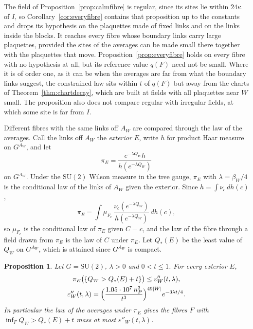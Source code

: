 \documentclass[11pt]{amsart}
\newtheorem{proposition}[theorem]{Proposition}
\theoremstyle{definition}
\theoremstyle{remark}
\numberwithin{equation}{section}
\newcommand{\SU}{\mathrm{SU}}
\begin{document}
The field of Proposition~\ref{prop:calmfibre} is regular, since its sites lie
within $24\kappa$ of $I$, so Corollary~\ref{cor:everyfibre} contains that
proposition up to the constants and drops its hypothesis on the plaquettes
made of fixed links and on the links inside the blocks. It reaches every
fibre whose boundary links carry large plaquettes, provided the sites of the
averages can be made small there together with the plaquettes that move.
Proposition~\ref{prop:everyfibre} holds on every fibre with no hypothesis at
all, but its reference value $q(F)$ need not be small. Where it is of order
one, as it can be when the averages are far from what the boundary links
suggest, the constrained law sits within $t$ of $q(F)$ but away from the
charts of Theorem~\ref{thm:chartdecay}, which are built at fields
with all plaquettes near $W$ small. The proposition also does not compare
regular with irregular fields, at which some site is far from $I$.

Different fibres with the same links off $A_W$ are compared through the
law of the averages. Call the links off $A_W$ the \emph{exterior} $E$, write
$h$ for product Haar measure on $G^{A_W}$, and let
\[
\pi_E=\frac{e^{-\lambda Q_W}h}{h(e^{-\lambda Q_W})}
\]
on $G^{A_W}$. Under the $\SU(2)$ Wilson measure in the tree gauge, $\pi_E$
with $\lambda=\beta_W/4$ is the conditional law of the links of $A_W$ given
the exterior. Since $h=\int\nu_c\,dh(c)$,
\[
\pi_E=\int\mu_{F_c}\,\frac{\nu_c(e^{-\lambda Q_W})}{h(e^{-\lambda Q_W})}
\,dh(c),
\]
so $\mu_{F_c}$ is the conditional law of $\pi_E$ given $C=c$, and the law
of the fibre through a field drawn from $\pi_E$ is the law of $C$ under
$\pi_E$. Let $Q_*(E)$ be the least value of $Q_W$ on $G^{A_W}$, which is
attained since $G^{A_W}$ is compact.

\begin{proposition}\label{prop:fibrecompare}
Let $G=\SU(2)$, $\lambda>0$ and $0<t\le1$. For every exterior $E$,
\begin{gather*}
\pi_E\bigl(\{Q_W>Q_*(E)+t\}\bigr)\le\varepsilon''_W(t,\lambda),\\
\varepsilon''_W(t,\lambda)=\Bigl(\frac{1.05\cdot10^7\,n_P^3}{t^3}\Bigr)
^{49|W|}e^{-3\lambda t/4}.
\end{gather*}
In particular the law of the averages under $\pi_E$ gives the fibres $F$
with $\inf_FQ_W>Q_*(E)+t$ mass at most $\varepsilon''_W(t,\lambda)$.
\end{proposition}
\end{document}
